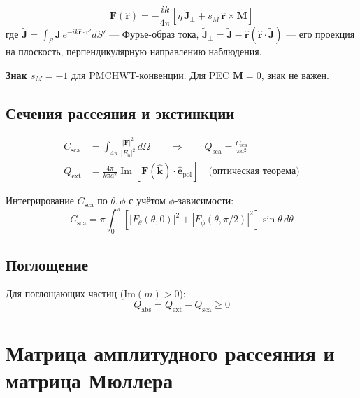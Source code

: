 \documentclass[12pt,a4paper]{article}
\begin{document}
\begin{equation}
  \mathbf{F}(\hat{\mathbf{r}}) = -\frac{ik}{4\pi} \left[
    \eta\,\tilde{\mathbf{J}}_\perp + s_M\,\hat{\mathbf{r}} \times \tilde{\mathbf{M}}
  \right]
\end{equation}
где $\tilde{\mathbf{J}} = \int_S \mathbf{J} \, e^{-ik\hat{\mathbf{r}}\cdot\mathbf{r}'} dS'$ --- Фурье-образ тока, $\tilde{\mathbf{J}}_\perp = \tilde{\mathbf{J}} - \hat{\mathbf{r}}(\hat{\mathbf{r}}\cdot\tilde{\mathbf{J}})$ --- его проекция на плоскость, перпендикулярную направлению наблюдения.

\textbf{Знак $s_M = -1$} для PMCHWT-конвенции. Для PEC $\mathbf{M}=0$, знак не важен.

\subsection{Сечения рассеяния и экстинкции}

\begin{align}
  C_{\mathrm{sca}} &= \int_{4\pi} \frac{|\mathbf{F}|^2}{|E_0|^2} \, d\Omega
  \qquad \Rightarrow \qquad Q_{\mathrm{sca}} = \frac{C_{\mathrm{sca}}}{\pi a^2} \\
  Q_{\mathrm{ext}} &= \frac{4\pi}{k \pi a^2} \operatorname{Im}\left[\mathbf{F}(\hat{\mathbf{k}}) \cdot \hat{\mathbf{e}}_{\mathrm{pol}}\right]
  \quad\text{(оптическая теорема)}
\end{align}

Интегрирование $C_{\mathrm{sca}}$ по $\theta, \phi$ с учётом $\phi$-зависимости:
\begin{equation}
  C_{\mathrm{sca}} = \pi \int_0^\pi \left[|F_\theta(\theta,0)|^2 + |F_\phi(\theta,\pi/2)|^2\right] \sin\theta \, d\theta
\end{equation}

\subsection{Поглощение}

Для поглощающих частиц ($\mathrm{Im}(m) > 0$):
\begin{equation}
  Q_{\mathrm{abs}} = Q_{\mathrm{ext}} - Q_{\mathrm{sca}} \geq 0
\end{equation}


\section{Матрица амплитудного рассеяния и матрица Мюллера}
\end{document}
